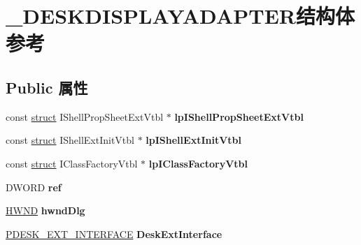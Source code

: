 \hypertarget{struct___d_e_s_k_d_i_s_p_l_a_y_a_d_a_p_t_e_r}{}\section{\+\_\+\+D\+E\+S\+K\+D\+I\+S\+P\+L\+A\+Y\+A\+D\+A\+P\+T\+E\+R结构体 参考}
\label{struct___d_e_s_k_d_i_s_p_l_a_y_a_d_a_p_t_e_r}
\subsection*{Public 属性}
\begin{DoxyCompactItemize}
\item 
\mbox{\label{struct___d_e_s_k_d_i_s_p_l_a_y_a_d_a_p_t_e_r_a749ba34f5ef14f01faa8b563381a8a54}} 
const \hyperlink{interfacestruct}{struct} I\+Shell\+Prop\+Sheet\+Ext\+Vtbl $\ast$ {\bfseries lp\+I\+Shell\+Prop\+Sheet\+Ext\+Vtbl}
\item 
\mbox{\label{struct___d_e_s_k_d_i_s_p_l_a_y_a_d_a_p_t_e_r_aeae7af242d7d8354d90d7f732052d6f8}} 
const \hyperlink{interfacestruct}{struct} I\+Shell\+Ext\+Init\+Vtbl $\ast$ {\bfseries lp\+I\+Shell\+Ext\+Init\+Vtbl}
\item 
\mbox{\label{struct___d_e_s_k_d_i_s_p_l_a_y_a_d_a_p_t_e_r_a1b7746585f09b8ceeb2b538968c3f077}} 
const \hyperlink{interfacestruct}{struct} I\+Class\+Factory\+Vtbl $\ast$ {\bfseries lp\+I\+Class\+Factory\+Vtbl}
\item 
\mbox{\label{struct___d_e_s_k_d_i_s_p_l_a_y_a_d_a_p_t_e_r_af06f979be995da591fb9ea4e9d42a7b2}} 
D\+W\+O\+RD {\bfseries ref}
\item 
\mbox{\label{struct___d_e_s_k_d_i_s_p_l_a_y_a_d_a_p_t_e_r_ab8d36d18ae417c14a84f89d8fa0341ec}} 
\hyperlink{interfacevoid}{H\+W\+ND} {\bfseries hwnd\+Dlg}
\item 
\mbox{\label{struct___d_e_s_k_d_i_s_p_l_a_y_a_d_a_p_t_e_r_a9288c1bdeeda2d45cd510d35b1e95aeb}} 
\hyperlink{struct___d_e_s_k___e_x_t___i_n_t_e_r_f_a_c_e}{P\+D\+E\+S\+K\+\_\+\+E\+X\+T\+\_\+\+I\+N\+T\+E\+R\+F\+A\+CE} {\bfseries Desk\+Ext\+Interface}

\end{DoxyCompactItemize}

